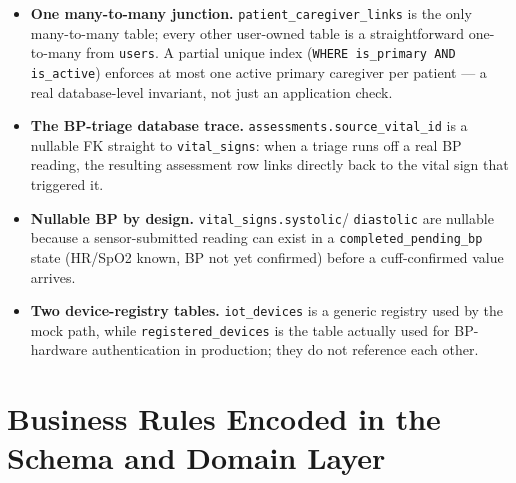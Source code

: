 \documentclass[12pt,a4paper]{report}
\begin{document}
\begin{itemize}[leftmargin=1.4em]
  \item \textbf{One many-to-many junction.} \texttt{patient\_caregiver\_links}
  is the only many-to-many table; every other user-owned table is a
  straightforward one-to-many from \texttt{users}. A partial unique index
  (\texttt{WHERE is\_primary AND is\_active}) enforces at most one active primary
  caregiver per patient --- a real database-level invariant, not just an
  application check.
  \item \textbf{The BP-triage database trace.}
  \texttt{assessments.source\_vital\_id} is a nullable FK straight to
  \texttt{vital\_signs}: when a triage runs off a real BP reading, the resulting
  assessment row links directly back to the vital sign that triggered it.
  \item \textbf{Nullable BP by design.} \texttt{vital\_signs.systolic}/
  \texttt{diastolic} are nullable because a sensor-submitted reading can exist in
  a \texttt{completed\_pending\_bp} state (HR/SpO2 known, BP not yet confirmed)
  before a cuff-confirmed value arrives.
  \item \textbf{Two device-registry tables.} \texttt{iot\_devices} is a generic
  registry used by the mock path, while \texttt{registered\_devices} is the
  table actually used for BP-hardware authentication in production; they do not
  reference each other.
\end{itemize}

\section{Business Rules Encoded in the Schema and Domain Layer}
\end{document}

